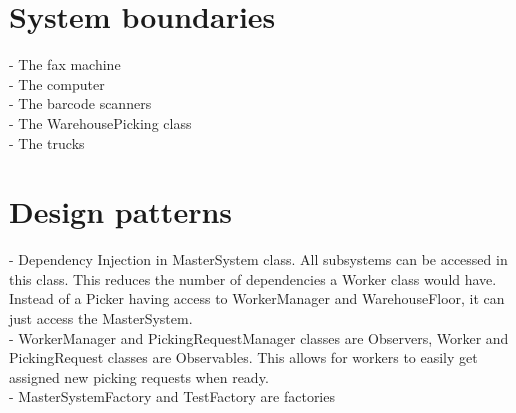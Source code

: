 \documentclass[12pt]{article}
\begin{document}
\section*{System boundaries}
    - The fax machine\\
    - The computer\\
    - The barcode scanners\\
    - The WarehousePicking class\\
    - The trucks
\pagebreak
\section*{Design patterns}
- Dependency Injection in MasterSystem class. All subsystems can be accessed in this class. This reduces the number of dependencies a Worker class would have. Instead of a Picker having access to WorkerManager and WarehouseFloor, it can just access the MasterSystem.\\
- WorkerManager and PickingRequestManager classes are Observers, Worker and PickingRequest classes are Observables. This allows for workers to easily get assigned new picking requests when ready.\\
- MasterSystemFactory and TestFactory are factories\\
\pagebreak
\end{document}
